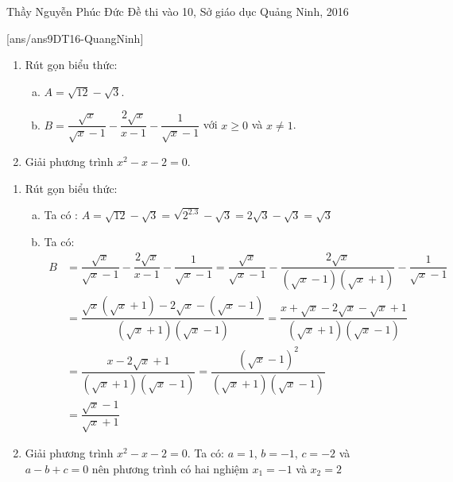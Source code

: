 \begin{name}
{Thầy  Nguyễn Phúc Đức}
{Đề thi vào 10, Sở giáo dục Quảng Ninh, 2016}
\end{name}
\setcounter{ex}{0}
[ans/ans9DT16-QuangNinh]
\begin{ex}%
    \hfill
    \begin{enumerate}[1.]
        \item Rút gọn biểu thức: 
        \begin{enumerate}[a)]
        \item $A=\sqrt{12}-\sqrt{3}$.
        \item $B=\dfrac{\sqrt{x}}{\sqrt{x}-1}-\dfrac{2\sqrt{x}}{x-1}-\dfrac{1}{\sqrt{x}-1}$ với $x\geq 0$ và $x\neq 1$.
        \end{enumerate}
        \item Giải phương trình $x^2-x-2=0$.
    \end{enumerate}
\loigiai
    {
    \begin{enumerate}[1.]
        \item Rút gọn biểu thức: 
        \begin{enumerate}[a)]
        \item Ta có : $A=\sqrt{12}-\sqrt{3}=\sqrt{2^2.3}-\sqrt{3}=2\sqrt{3}-\sqrt{3}=\sqrt{3}$
        \item Ta có: 
        \begin{align*}
        B&=\dfrac{\sqrt{x}}{\sqrt{x}-1}-\dfrac{2\sqrt{x}}{x-1}-\dfrac{1}{\sqrt{x}-1} 
       =\dfrac{\sqrt{x}}{\sqrt{x}-1}-\dfrac{2\sqrt{x}}{(\sqrt{x}-1)(\sqrt{x}+1)}-\dfrac{1}{\sqrt{x}-1} \\
        &=\dfrac{\sqrt{x}(\sqrt{x}+1)-2\sqrt{x}-(\sqrt{x}-1)}{(\sqrt{x}+1)(\sqrt{x}-1)}
        =\dfrac{x+\sqrt{x}-2\sqrt{x}-\sqrt{x}+1}{(\sqrt{x}+1)(\sqrt{x}-1)}\\
        &=\dfrac{x-2\sqrt{x}+1}{(\sqrt{x}+1)(\sqrt{x}-1)}
        =\dfrac{(\sqrt{x}-1)^2}{(\sqrt{x}+1)(\sqrt{x}-1)}\\
        &=\dfrac{\sqrt{x}-1}{\sqrt{x}+1}
        \end{align*}
        \end{enumerate}
        \item Giải phương trình $x^2-x-2=0$. Ta có: $a=1$, $b=-1$, $c=-2$ và $a-b+c=0$ nên phương trình có hai nghiệm $x_1=-1$ và $x_2=2$ 
       \end{enumerate}
    }
\end{ex}

